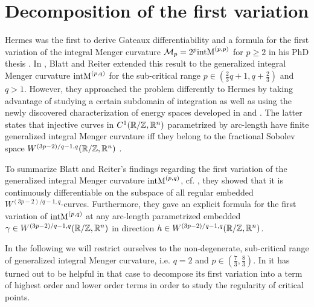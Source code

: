 \newcommand{\G}[1][p]{\ensuremath{\mathcal G^{(#1)}}}
\newcommand{\T}[3][\g]{\triangle_{#2,#3}{#1}}
\newcommand{\g}{\gamma}
\newcommand{\dg}{{\gamma}'}
\newcommand{\br}[1]{\ensuremath{\left(#1\right)}}
\newcommand{\Wia}[1][(3p-2)/q-1,q]{\ensuremath{W_{\mathrm{ia}}^{#1}}}
\newcommand{\s}{\ensuremath{\sigma}}
\newcommand{\gp}{g^{p}}
\newcommand{\W}[1][(3p-2)/q-1,q]{\ensuremath{W^{\scriptstyle #1}}}

\section{Decomposition of the first variation}
\label{sec:Decomposition}

Hermes was the first to derive Gateaux differentiability and a formula for the first variation of the integral Menger curvature $\mathcal{M}_p =  2^p \textnormal{intM}^{(p,p)} $ for $p\geq 2$ in his PhD thesis \cite[Theorem\,2.33, Remark\,2.35]{Hermes:2012:Menger}. In \cite[Theorem\,3]{BlattReiter:2015:Menger}, Blatt and Reiter extended this result to the generalized integral Menger curvature $\textnormal{intM}^{(p,q)}$ for the sub-critical range $p\in (\tfrac 23 q+1, q+\tfrac 23)$ and $q>1$. However, they approached the problem differently to Hermes by taking advantage of studying a certain subdomain of integration as well as using the newly discovered characterization of energy spaces developed in \cite[Theorem\,1.1]{Blatt:2013:NoteMenger} and \cite[Theorem\,1]{BlattReiter:2015:Menger}. The latter states that injective curves in $C^1(\mathbb{R}/\mathbb{Z},\mathbb{R}^n)$ parametrized by arc-length have finite generalized integral Menger curvature iff they belong to the fractional Sobolev space $W^{(3p-2)/q-1,q} (\mathbb{R}/\mathbb{Z}, \mathbb{R}^n)$ \cite[Theorem 1]{BlattReiter:2015:Menger}. 

To summarize Blatt and Reiter's findings regarding the first variation of  the generalized integral Menger curvature $\textnormal{intM}^{(p,q)}$, cf. \cite[Theorem 3]{BlattReiter:2015:Menger}, they showed that it is continuously differentiable on the subspace of all regular embedded $W^{(3p-2)/q-1,q}$-curves. Furthermore, they gave an explicit formula for the first variation  of $\textnormal{intM}^{(p,q)}$ at  any arc-length parametrized embedded $\gamma \in W^{(3p-2)/q-1,q}(\mathbb{R}/\mathbb{Z}, \mathbb{R}^n)$ in direction $h \in W^{(3p-2)/q-1,q}(\mathbb{R}/\mathbb{Z}, \mathbb{R}^n)$.

In the following we will restrict ourselves to the non-degenerate, sub-critical range of generalized integral Menger curvature, i.e. $q=2$ and $p\in(\tfrac 73, \tfrac 83)$. In \cite{BlattReiter:2015:Menger} it has turned out to be helpful in that case to decompose its first variation  into a term of highest order and lower order terms in order to study the regularity of critical points.

